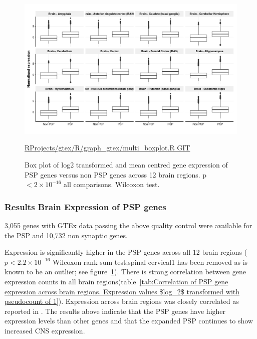 \begin{figure}
    \centering
    \includegraphics[width=\textwidth]{images/chapter2/ggplot/gtex/Rplot_boxplot_expression_add_theme.png}
    \caption{Box plot of log2 transformed and mean centred gene expression of PSP genes versus non PSP genes across 12 brain regions. p $< 2 \times 10^{-16}$ all comparisons. Wilcoxon test.}
    \tiny\url{RProjects/gtex/R/graph_gtex/multi_boxplot.R GIT}
    \label{fig:gtex_boxplot}
\end{figure}




\subsubsection{Results Brain Expression of PSP genes}
\label{sec:gtex_results}
3,055 genes with GTEx data passing the above quality control were available for the PSP and 10,732 non synaptic genes. 

Expression is significantly higher in the PSP genes across all 12 brain regions ($p<2.2\times10^{-16}$ Wilcoxon rank sum test;spinal cervical1 has been removed as is known to be an outlier; see figure~\ref{fig:gtex_boxplot}).  There is strong correlation between gene expression counts in all brain regions(table~\ref{tab:Correlation of PSP gene expression across brain regions. Expression values $log_2$ transformed with pseudocount of 1}). Expression across brain regions was closely correlated as reported in \cite{gtex2015genotype}. The results above indicate that the PSP genes have higher expression levels than other genes and that the expanded PSP continues to show increased CNS expression. 

